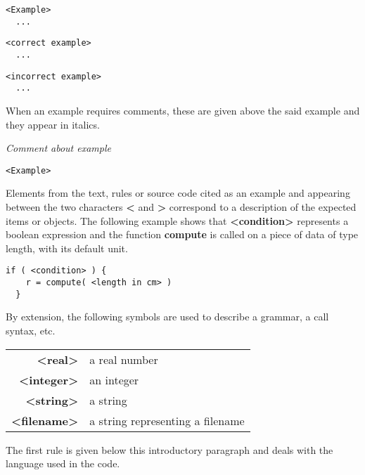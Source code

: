 \lstset{language=C++, basicstyle=\normalsize}
\begin{lstlisting}[frame=TRL]
  <Example>
  ...
\end{lstlisting}
\begin{lstlisting}[frame=RL]
  <correct example>
  ...
\end{lstlisting}

\begin{lstlisting}[frame=RLB]
  <incorrect example>
  ...
\end{lstlisting}

When an example requires comments, these are given above the said example and they appear in italics.

\emph{Comment about example}
\lstset{language=C++, basicstyle=\normalsize}
\begin{lstlisting}[frame=TRBL]
  <Example>
\end{lstlisting}

Elements from the text, rules or source code cited as an example and appearing between the two characters {\bf <} and {\bf >} correspond to a description of the expected items or objects. The following example shows that {\bf <condition>} represents a boolean expression and the function {\bf compute} is called on a piece of data of type length, with its default unit.

\begin{lstlisting}[frame=TRBL]
  if ( <condition> ) {
    r = compute( <length in cm> )
  }
\end{lstlisting}

By extension, the following symbols are used to describe a grammar, a call syntax, etc.

\begin{tabular}{rl}
  {\bf <real>} & a real number \\
  {\bf <integer>} & an integer \\
  {\bf <string>} & a string \\
  {\bf <filename>} & a string representing a filename
\end{tabular}

The first rule is given below this introductory paragraph and deals with the language used in the code.

